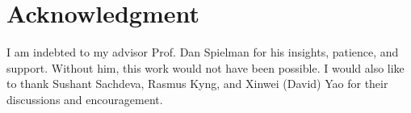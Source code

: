 \documentclass[12pt]{amsart}
\begin{document}
\section{Acknowledgment}\label{sec:acknowledgment}
I am indebted to my advisor Prof. Dan Spielman for his insights, patience, and support. Without him, this work would not have been possible. I would also like to thank Sushant Sachdeva, Rasmus Kyng, and Xinwei (David) Yao for their discussions and encouragement.



 
\end{document}
